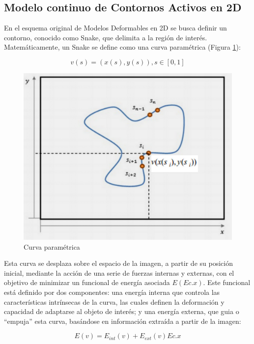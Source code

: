 \subsection{Modelo continuo de Contornos Activos en 2D}\label{section:modelo_continuo_contornos_activos}

En el esquema original de Modelos Deformables en 2D se busca definir un contorno, conocido como Snake, que delimita a la región de interés. Matemáticamente, un Snake se define como una curva paramétrica (Figura \ref{fig:curva_parametrica}):

$$ v(s) = (x(s), y(s)), s \in [0,1] $$

\begin{figure}[h!]
	\centering
	\includegraphics[scale=0.05]{images/grafico_snake_parametrico.jpg}
	\caption{Curva paramétrica}
	\label{fig:curva_parametrica}
\end{figure}

Esta curva se desplaza sobre el espacio de la imagen, a partir de su posición inicial, mediante la acción de una serie de fuerzas internas y externas, con el objetivo de minimizar un funcional de energía asociada $E(Ec.x)$. Este funcional está definido por dos componentes: una energía interna que controla las características intrínsecas de la curva, las cuales definen la deformación y capacidad de adaptarse al objeto de interés; y una energía externa, que guia o “empuja” esta curva, basándose en información extraída a partir de la imagen:

$$ E(v) = E_{int}(v) + E_{ext}(v) Ec.x $$

